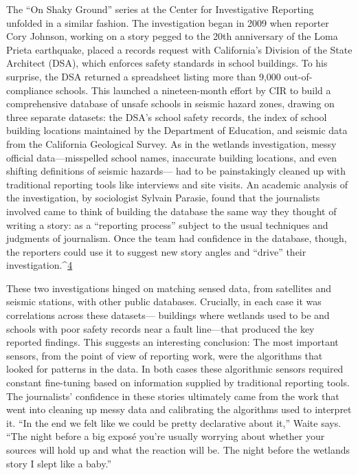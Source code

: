\begin{itemize}
\begin{itemized}
The ``On Shaky Ground'' series at the Center for Investigative Reporting
unfolded in a similar fashion. The investigation began in 2009 when reporter
Cory Johnson, working on a story pegged to the 20th anniversary of the
Loma Prieta earthquake, placed a records request with California's Division
of the State Architect (DSA), which enforces safety standards in school
buildings. To his surprise, the DSA returned a spreadsheet listing more than 9,000 out-of-compliance schools. This launched a nineteen-month effort by
CIR to build a comprehensive database of unsafe schools in seismic hazard
zones, drawing on three separate datasets: the DSA's school safety records,
the index of school building locations maintained by the Department of
Education, and seismic data from the California Geological Survey. As in
the wetlands investigation, messy official data—misspelled school names,
inaccurate building locations, and even shifting definitions of seismic hazards—
had to be painstakingly cleaned up with traditional reporting tools
like interviews and site visits. An academic analysis of the investigation, by
sociologist Sylvain Parasie, found that the journalists involved came to think
of building the database the same way they thought of writing a story: as a
``reporting process'' subject to the usual techniques and judgments of journalism.
Once the team had confidence in the database, though, the reporters
could use it to suggest new story angles and ``drive'' their investigation.^{\href{#endnotes-graves}{4}}

These two investigations hinged on matching sensed data, from satellites
and seismic stations, with other public databases. Crucially, in each case it
was correlations across these datasets— buildings where wetlands used to
be and schools with poor safety records near a fault line—that produced the
key reported findings. This suggests an interesting conclusion: The most
important sensors, from the point of view of reporting work, were the algorithms
that looked for patterns in the data. In both cases these algorithmic
sensors required constant fine-tuning based on information supplied by
traditional reporting tools. The journalists' confidence in these stories ultimately
came from the work that went into cleaning up messy data and calibrating
the algorithms used to interpret it. ``In the end we felt like we could
be pretty declarative about it,'' Waite says. ``The night before a big exposé
you're usually worrying about whether your sources will hold up and what
the reaction will be. The night before the wetlands story I slept like a baby.''


\end{itemized}
\end{itemize}
